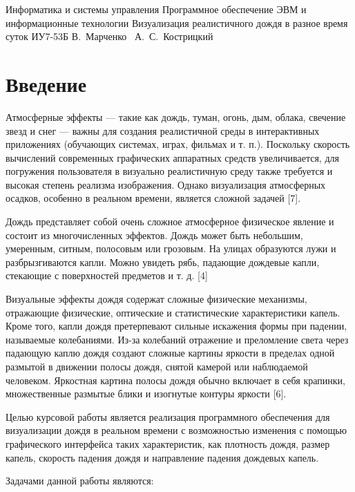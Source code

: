 



\makecourseworktitle
    {Информатика и системы управления}
    {Программное обеспечение ЭВМ и информационные технологии}
    {Визуализация реалистичного дождя в разное время суток}
    {ИУ7-53Б}
    {В.~Марченко}
    {~А.~С.~Кострицкий}
    {}
    {}
    
\tableofcontents

{\center\chapter*{Введение}}

Атмосферные эффекты --- такие как дождь, туман, огонь, дым, облака, свечение звезд и снег --- важны для создания реалистичной среды в интерактивных приложениях (обучающих системах, играх, фильмах и т. п.). 
Поскольку скорость вычислений современных графических аппаратных средств увеличивается, для погружения пользователя в визуально реалистичную среду также требуется и высокая степень реализма изображения. 
Однако визуализация атмосферных осадков, особенно в реальном времени, является сложной задачей [7].

Дождь представляет собой очень сложное атмосферное физическое явление и состоит из многочисленных эффектов. 
Дождь может быть небольшим, умеренным, ситным, полосовым или грозовым. 
На улицах образуются лужи и разбрызгиваются капли. 
Можно увидеть рябь, падающие дождевые капли, стекающие с поверхностей предметов и т. д. [4]

Визуальные эффекты дождя содержат сложные физические механизмы, отражающие физические, оптические и статистические характеристики капель. 
Кроме того, капли дождя претерпевают сильные искажения формы при падении, называемые колебаниями. 
Из-за колебаний отражение и преломление света через падающую каплю дождя создают сложные картины яркости в пределах одной размытой в движении полосы дождя, снятой камерой или наблюдаемой человеком. 
Яркостная картина полосы дождя обычно включает в себя крапинки, множественные размытые блики и изогнутые контуры яркости [6].

Целью курсовой работы является реализация программного обеспечения для визуализации дождя в реальном времени с возможностью изменения с помощью графического интерфейса таких характеристик, как плотность дождя, размер капель, скорость падения дождя и направление падения дождевых капель.

Задачами данной работы являются:

